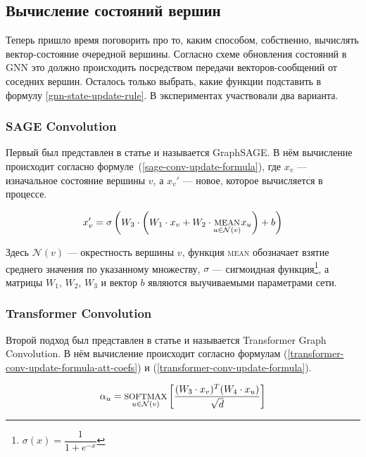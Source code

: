 \subsection{Вычисление состояний вершин}

Теперь пришло время поговорить про то, каким способом, собственно, вычислять вектор-состояние очередной вершины. Согласно схеме обновления состояний в GNN это должно происходить посредством передачи векторов-сообщений от соседних вершин. Осталось только выбрать, какие функции подставить в формулу \ref{gnn-state-update-rule}. В экспериментах участвовали два варианта.

\subsubsection{SAGE Convolution} \label{sage-conv-desc}

Первый был представлен в статье \cite{sage-conv-paper} и называется GraphSAGE. В нём вычисление происходит согласно формуле~(\ref{sage-conv-update-formula}), где $x_v$ --- изначальное состояние вершины $v$, а $x_v'$ --- новое, которое вычисляется в процессе.

\begin{equation} \label{sage-conv-update-formula}
    x_v' = \sigma \left(W_3 \cdot \left(W_1 \cdot x_v + W_2 \cdot \underset{u \in \mathcal{N}(v)}{\text{\textsc{mean}}} x_u \right) + b \right)
\end{equation}

Здесь $\mathcal{N}(v)$ --- окрестность вершины $v$, функция \textsc{mean} обозначает взятие среднего значения по указанному множеству, $\sigma$ --- сигмоидная функция\footnote{$\sigma(x) = \dfrac{1}{1 + e^{-x}}$}, а матрицы $W_1$, $W_2$, $W_3$ и вектор $b$ являются выучиваемыми параметрами сети.

\subsubsection{Transformer Convolution} \label{transformer-conv-desc}

Второй подход был представлен в статье \cite{transformer-conv-paper} и называется Transformer Graph Convolution. В нём вычисление происходит согласно формулам (\ref{transformer-conv-update-formula-att-coefs}) и (\ref{transformer-conv-update-formula}).

\begin{equation} \label{transformer-conv-update-formula-att-coefs}
    \alpha_{u} = \underset{u \in \mathcal{N}(v)}{\text{\textsc{softmax}}} \left[\frac{(W_3 \cdot x_v)^T (W_4 \cdot x_u)}{\sqrt d} \right]
\end{equation}

